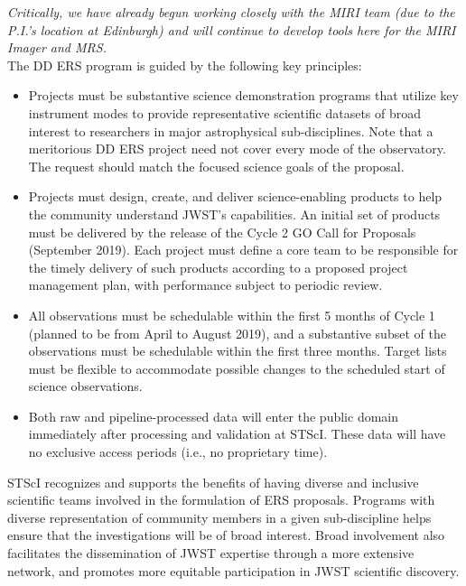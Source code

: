 {\noindent
{\it Critically, we have already begun working closely with the MIRI team (due to the P.I.'s location at Edinburgh) and will continue to develop tools here for the MIRI Imager and MRS.}\\


\noindent
The DD ERS program is guided by the following key principles:
\begin{itemize}
\item Projects must be substantive science demonstration programs that utilize key instrument modes to provide representative scientific datasets of broad interest to researchers in major astrophysical sub-disciplines. Note that a meritorious DD ERS project need not cover every mode of the observatory. The request should match the focused science goals of the proposal.

\item Projects must design, create, and deliver science-enabling products to help the community understand JWST's capabilities.  An initial set of products must be delivered by the release of the Cycle 2 GO Call for Proposals (September 2019).  Each project must define a core team to be responsible for the timely delivery of such products according to a proposed project management plan, with performance subject to periodic review.

\item All observations must be schedulable within the first 5 months of Cycle 1 (planned to be from April to August 2019), and a substantive subset of the observations must be schedulable within the first three months.   Target lists must be flexible to accommodate possible changes to the scheduled start of science observations.

\item Both raw and pipeline-processed data will enter the public domain immediately after processing and validation at STScI. These data will have no exclusive access periods (i.e., no proprietary time).
\end{itemize}


\smallskip \smallskip
\noindent
STScI recognizes and supports the benefits of having diverse and inclusive scientific teams involved in the formulation of ERS proposals.  Programs with diverse representation of community members in a given sub-discipline helps ensure that the investigations will be of broad interest. Broad involvement also facilitates the dissemination of JWST expertise through a more extensive network, and promotes more equitable participation in JWST scientific discovery.

}
